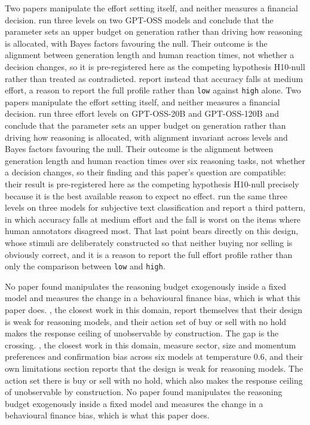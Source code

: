 \ifsubmission
Two papers manipulate the effort setting itself, and neither measures a
financial decision. \citet{hu2026effort} run three levels on two GPT-OSS
models and conclude that the parameter sets an upper budget on generation
rather than driving how reasoning is allocated, with Bayes factors favouring
the null. Their outcome is the alignment between generation length and human
reaction times, not whether a decision changes, so it is pre-registered here
as the competing hypothesis H10-null rather than treated as contradicted.
\citet{piya2026overthinking} report instead that accuracy falls at medium
effort, a reason to report the full profile rather than \texttt{low} against
\texttt{high} alone.
\else
Two papers manipulate the effort setting itself, and neither measures a
financial decision. \citet{hu2026effort} run three effort levels on
GPT-OSS-20B and GPT-OSS-120B and conclude that the parameter sets an upper
budget on generation rather than driving how reasoning is allocated, with
alignment invariant across levels and Bayes factors favouring the null. Their
outcome is the alignment between generation length and human reaction times
over six reasoning tasks, not whether a decision changes, so their finding
and this paper's question are compatible: their result is pre-registered here
as the competing hypothesis H10-null precisely because it is the best
available reason to expect no effect. \citet{piya2026overthinking} run the
same three levels on three models for subjective text classification and
report a third pattern, in which accuracy falls at medium effort and the fall
is worst on the items where human annotators disagreed most. That last point
bears directly on this design, whose stimuli are deliberately constructed so
that neither buying nor selling is obviously correct, and it is a reason to
report the full effort profile rather than only the comparison between
\texttt{low} and \texttt{high}.
\fi

\ifsubmission
No paper found manipulates the reasoning budget exogenously inside a fixed
model and measures the change in a behavioural finance bias, which is what
this paper does. \citet{lee2025yourai}, the closest work in this domain,
report themselves that their design is weak for reasoning models, and their
action set of buy or sell with no hold makes the response ceiling of
 unobservable by construction.
\else
The gap is the crossing. \citet{lee2025yourai}, the closest work in this
domain, measure sector, size and momentum preferences and confirmation bias
across six models at temperature 0.6, and their own limitations section
reports that the design is weak for reasoning models. The action set there is
buy or sell with no hold, which also makes the response ceiling of
 unobservable by construction. No paper found
manipulates the reasoning budget exogenously inside a fixed model and
measures the change in a behavioural finance bias, which is what this paper
does.
\fi

